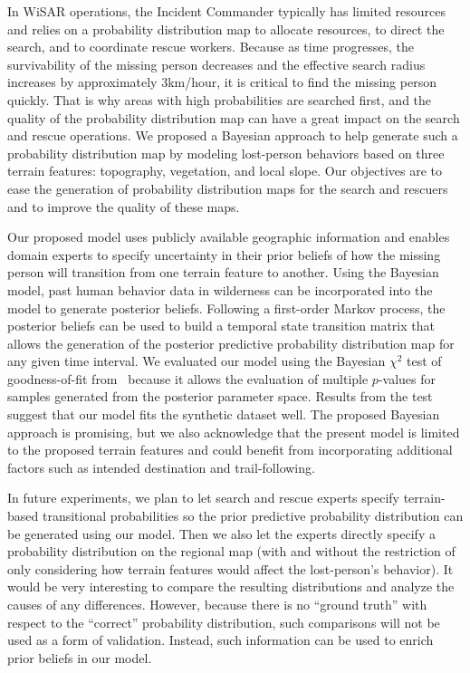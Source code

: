 \documentclass[smallextended,natbib]{svjour3}
\begin{document}
In WiSAR operations, the Incident Commander typically has limited resources and relies on a probability distribution map to allocate resources, to direct the search, and to coordinate rescue workers. Because as time progresses, the survivability of the missing person decreases and the effective search radius increases by approximately 3km/hour, it is critical to find the missing person quickly. That is why areas with high probabilities are searched first, and the quality of the probability distribution map can have a great impact on the search and rescue operations. We proposed a Bayesian approach to help generate such a probability distribution map by modeling lost-person behaviors based on three terrain features: topography, vegetation, and local slope. Our objectives are to ease the generation of probability distribution maps for the search and rescuers and to improve the quality of these maps.

Our proposed model uses publicly available geographic information and enables domain experts to specify uncertainty in their prior beliefs of how the missing person will transition from one terrain feature to another. Using the Bayesian model, past human behavior data in wilderness can be incorporated into the model to generate posterior beliefs. Following a first-order Markov process, the posterior beliefs can be used to build a temporal state transition matrix that allows the generation of the posterior predictive probability distribution map for any given time interval. We evaluated our model using the Bayesian $\chi^2$ test of goodness-of-fit from~\cite{Chi-squaredTest} because it allows the evaluation of multiple $p$-values for samples generated from the posterior parameter space. Results from the test suggest that our model fits the synthetic dataset well. The proposed Bayesian approach is promising, but we also acknowledge that the present model is limited to the proposed terrain features and could benefit from incorporating additional factors such as intended destination and trail-following.

In future experiments, we plan to let search and rescue experts specify terrain-based transitional probabilities so the prior predictive probability distribution can be generated using our model. Then we also let the experts directly specify a probability distribution on the regional map (with and without the restriction of only considering how terrain features would affect the lost-person's behavior). It would be very interesting to compare the resulting distributions and analyze the causes of any differences. However, because there is no ``ground truth'' with respect to the ``correct'' probability distribution, such comparisons will not be used as a form of validation. Instead, such information can be used to enrich prior beliefs in our model.
\end{document}
